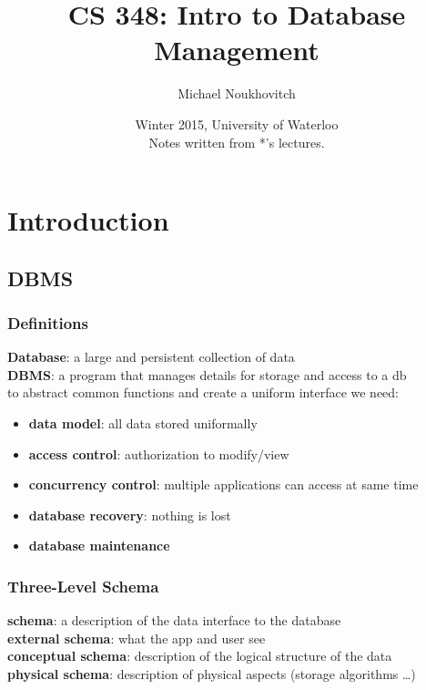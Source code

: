 \documentclass[]{article}
\theoremstyle{definition}
\begin{document}
	\let\ref\Cref

	\title{\bf{CS 348: Intro to Database Management}}
	\date{Winter 2015, University of Waterloo \\ \center Notes written from *'s lectures.}
	\author{Michael Noukhovitch}

	\maketitle
	\newpage
	\tableofcontents
	\newpage

	\section{Introduction}
		\subsection{DBMS}
			\subsubsection{Definitions}
				\textbf{Database}: a large and persistent collection of data \\
				\textbf{DBMS}: a program that manages details for storage and access to a db \\
				to abstract common functions and create a uniform interface we need:
				\begin{itemize}
					\item \textbf{data model}: all data stored uniformally
					\item \textbf{access control}: authorization to modify/view
					\item \textbf{concurrency control}: multiple applications can access at same time 
					\item \textbf{database recovery}: nothing is lost 
					\item \textbf{database maintenance}
				\end{itemize}
			\subsubsection{Three-Level Schema}
				\textbf{schema}: a description of the data interface to the database \\
				\textbf{external schema}: what the app and user see \\
				\textbf{conceptual schema}: description of the logical structure of the data \\
				\textbf{physical schema}: description of physical aspects (storage
	algorithms \ldots{}) \\
	
\end{document}
